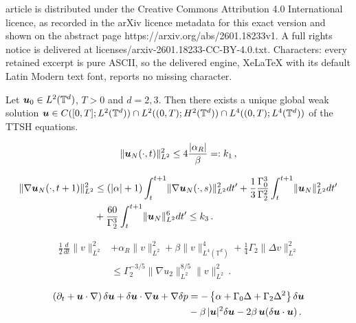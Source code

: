 \documentclass[10pt,a4paper]{amsart}
\newcommand{\Gamtwo}{\Gamma_{2}}
\newcommand{\Gamzero}{\Gamma_{0}}
\newcommand{\Rb}{\beta}
\newcommand{\bu}{\mbox{\boldmath$u$}}
\begin{document}
article is distributed under the Creative Commons Attribution 4.0 International licence, as recorded in the arXiv licence metadata for this exact version and shown on the abstract page https://arxiv.org/abs/2601.18233v1. A full rights notice is delivered at licenses/arxiv-2601.18233-CC-BY-4.0.txt. Characters: every retained excerpt is pure ASCII, so the delivered engine, XeLaTeX with its default Latin Modern text font, reports no missing character.
\begin{theorem} \label{weaksolutionsthm}
Let $\bu_0 \in L^2 (\mathbb{T}^d)$, $T > 0$ and $d=2,3$. Then there exists a unique global weak solution $\bu \in C([0,T];L^2(\mathbb{T}^d)) \cap L^2 ((0,T); H^2 (\mathbb{T}^d)) \cap L^4 ((0,T); L^4 (\mathbb{T}^d))$ of the TTSH equations.
\end{theorem}

\begin{equation} \label{absorbingballL2}
\lVert \bu_N (\cdot, t) \rVert_{L^2}^2 \leq 4 \frac{|\alpha_{R}|}{\Rb} =: k_{1}\,,
\end{equation}

\begin{align} 
\lVert \nabla \bu_N (\cdot, t + 1) \rVert_{L^2}^2 &\leq (\lvert \alpha \rvert + 1) \int_t^{t+1} \lVert \nabla \bu_N (\cdot, s) \rVert_{L^2}^2 dt' + \frac{1}{3} \frac{\Gamzero^3}{\Gamtwo^2} \int_t^{t+1} \lVert \bu_N \rVert_{L^2}^2 dt' \nonumber \\
&+ \frac{60}{\Gamtwo^3} \int_t^{t+1} \lVert \bu_N \rVert_{L^2}^6 dt' \leq k_{3}\,. \label{H1absorbingball}
\end{align}

\begin{align} \label{differenceestimate}
\frac{1}{2} \frac{d}{d t} \lVert v \rVert_{L^2}^2 &+ \alpha_{R} \lVert v \rVert_{L^2}^2 + \Rb \lVert v \rVert_{L^4 (\mathbb{T}^d)}^4 + \frac{1}{4} \Gamtwo \lVert \Delta v \rVert_{L^2}^2 \\
&\leq \Gamtwo^{-3/5} \lVert \nabla u_2 \rVert_{L^2}^{8/5} \lVert v \rVert_{L^2}^2\,. \nonumber
\end{align}

\begin{align}
\left(\partial_{t} + \bu\cdot\nabla\right)\delta\bu + \delta\bu\cdot\nabla\bu + \nabla \delta p 
&= -\left\{\alpha + \Gamzero \Delta + \Gamtwo \Delta^{2}\right\}\delta\bu\nonumber\\
&- \Rb\,\lvert \bu \rvert^{2}\delta\bu - 2\Rb\,\bu(\delta \bu \cdot \bu )\,. \label{linearisedequation}
\end{align}
\end{document}
